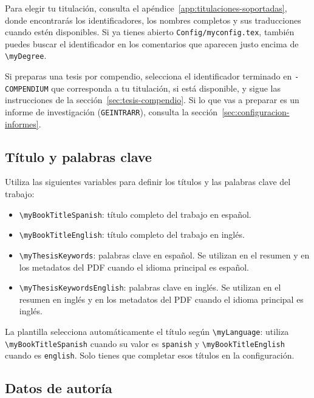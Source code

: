 Para elegir tu titulación, consulta el apéndice~\ref{app:titulaciones-soportadas}, donde encontrarás los identificadores, los nombres completos y sus traducciones cuando estén disponibles. Si ya tienes abierto \texttt{Config/myconfig.tex}, también puedes buscar el identificador en los comentarios que aparecen justo encima de \texttt{\textbackslash{}myDegree}.

Si preparas una tesis por compendio, selecciona el identificador terminado en \texttt{-COMPENDIUM} que corresponda a tu titulación, si está disponible, y sigue las instrucciones de la sección~\ref{sec:tesis-compendio}. Si lo que vas a preparar es un informe de investigación (\texttt{GEINTRARR}), consulta la sección~\ref{sec:configuracion-informes}.

\subsection{Título y palabras clave}

Utiliza las siguientes variables para definir los títulos y las palabras clave del trabajo:

\begin{itemize}
  \item \texttt{\textbackslash{}myBookTitleSpanish}: título completo del trabajo en español.
  \item \texttt{\textbackslash{}myBookTitleEnglish}: título completo del trabajo en inglés.
  \item \texttt{\textbackslash{}myThesisKeywords}: palabras clave en español. Se utilizan en el resumen y en los metadatos del PDF cuando el idioma principal es español.
  \item \texttt{\textbackslash{}myThesisKeywordsEnglish}: palabras clave en inglés. Se utilizan en el resumen en inglés y en los metadatos del PDF cuando el idioma principal es inglés.
\end{itemize}

La plantilla selecciona automáticamente el título según \texttt{\textbackslash{}myLanguage}: utiliza \texttt{\textbackslash{}myBookTitleSpanish} cuando su valor es \texttt{spanish} y \texttt{\textbackslash{}myBookTitleEnglish} cuando es \texttt{english}. Solo tienes que completar esos títulos en la configuración.

\subsection{Datos de autoría}

